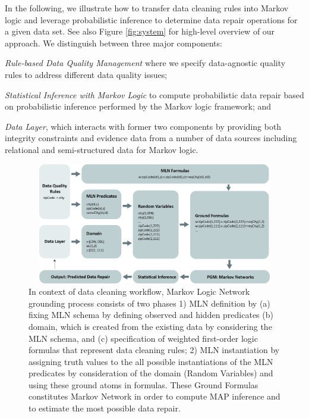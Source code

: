 In the following, we illustrate how to transfer data cleaning rules into Markov logic and leverage probabilistic inference to determine data repair operations for a given data set. See also Figure \ref{fig:system} for high-level overview of our approach. We distinguish between three major components: 
\begin{inparaenum}
\item \textit{Rule-based Data Quality Management} where we specify data-agnostic quality rules to address different data quality issues;
\item \textit{Statistical Inference with Markov Logic} to compute probabilistic data repair based on probabilistic inference performed by the Markov logic framework; and
\item \textit{Data Layer}, which interacts with former two components by providing both integrity constraints and evidence data from a number of data sources including relational and
semi-structured data for Markov logic.
\end{inparaenum}


\begin{figure}[t]
 \centering
 \includegraphics[width=450px, height=200px]{img/mlogic-grounging.jpg}
 \caption{
 In context of data cleaning workflow, Markov Logic Network grounding process consists of two phases 
 1) MLN definition by 
(a) fixing MLN schema by defining observed and hidden predicates
(b) domain, which is created from the existing data by considering the MLN schema, and 
(c) specification of weighted first-order logic formulas that represent data cleaning rules;
 2) MLN instantiation by assigning truth values to the all possible instantiations of the MLN predicates by consideration of the domain (Random Variables) and using these ground atoms in formulas. These Ground Formulas constitutes Markov Network in order to compute MAP inference and to estimate the most possible data repair.}
 \label{fig:mlngrounding}
\end{figure}

